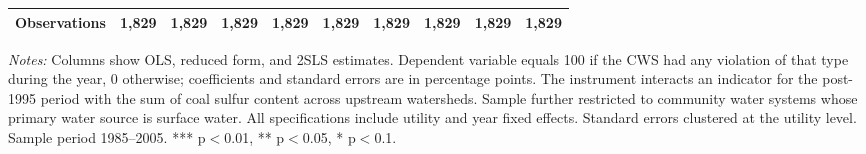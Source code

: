 \begin{table}[htbp]
\begin{adjustbox}{width = \textwidth, center}
\begin{tabular}{lrrrrrrrrr}
         Observations                                             & 1,829         & 1,829          & 1,829     & 1,829         & 1,829          & 1,829     & 1,829         & 1,829         & 1,829\\  
         
         \bottomrule
         
      \end{tabular}
      
      
      
   \end{adjustbox}
      {\tiny\linespread{1}\selectfont \par \raggedright 
   \textit{Notes:} Columns show OLS, reduced form, and 2SLS estimates. Dependent variable equals 100 if the CWS had any violation of that type during the year, 0 otherwise; coefficients and standard errors are in percentage points. The instrument interacts an indicator for the post-1995 period with the sum of coal sulfur content across upstream watersheds. Sample further restricted to community water systems whose primary water source is surface water. All specifications include utility and year fixed effects. Standard errors clustered at the utility level. Sample period 1985--2005. *** p$<$0.01, ** p$<$0.05, * p$<$0.1.}
   
\end{table}


